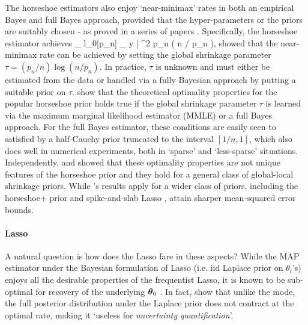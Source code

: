\documentclass[11pt]{article}
\begin{document}
The horseshoe estimators also enjoy `near-minimax' rates in both an empirical Bayes and full Bayes approach, provided that the hyper-parameters or the priors are suitably chosen - as proved in a series of papers \citep{van2014horseshoe,van2015conditions,van2016many,van2017adaptive}. Specifically, the horseshoe estimator achieves
\beq
\sup_{ \theta \in l_0[p_n] } \; _{ y | \theta } ^2 \asymp p_n \log \left ( n / p_n \right ), \label{eq:minimax}
\eeq
\citet{van2014horseshoe} showed that the near-minimax rate can be achieved by setting the global shrinkage parameter $\tau = (p_n/n) \log(n/p_n)$. In practice, $\tau$ is unknown and must either be estimated from the data or handled via a fully Bayesian approach by putting a suitable prior on $\tau$.  \cite{van2017adaptive} show that the theoretical optimality properties for the popular horseshoe prior holds true if the global shrinkage parameter $\tau$ is learned via the maximum marginal likelihood estimator (MMLE) or a full Bayes approach. For the full Bayes estimator, these conditions are easily seen to satisfied by a half-Cauchy prior truncated to the interval $[1/n,1]$, which also does well in numerical experiments, both in `sparse' and `less-sparse' situations. Independently, \citet{van2015conditions} and \citet{ghosh2016asymptotic} showed that these optimality properties are not unique features of the horseshoe prior and they hold for a general class of global-local shrinkage priors. While \cite{van2015conditions}'s results apply for a wider class of priors, including the horseshoe+ prior \citep{bhadra2015horseshoe+} and spike-and-slab Lasso \citep{rovckova2016spike}, \citet{ghosh2016asymptotic} attain sharper mean-squared error bounds. 

\paragraph{Lasso}

A natural question is how does the Lasso fare in these aspects? While the MAP estimator under the Bayesian formulation of Lasso (i.e. iid Laplace prior on $\theta_i$'s) enjoys all the desirable properties of the frequentist Lasso, it is known to be sub-optimal for recovery of the underlying $\boldsymbol{\theta}_0$ \citep{castillo2012needles}. In fact, \cite{castillo2012needles} show that unlike the mode, the full posterior distribution under the Laplace prior does not contract at the optimal rate, making it `useless for \textit{uncertainty quantification}'. 
\end{document}

